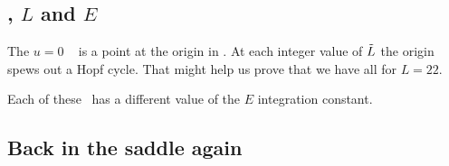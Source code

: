 {%


\subsection*{\Eqva, $L$ and $E$}


The $u=0$  \eqv~ is a point at the origin
in .
At
each integer value of $\tilde{L}$ the origin spews out a Hopf cycle. That
might help us prove that we have all {\eqva} for $L=22$.

Each of these \eqva\ has a different value of the $E$ integration
constant.




\subsection{Back in the saddle again}

}
